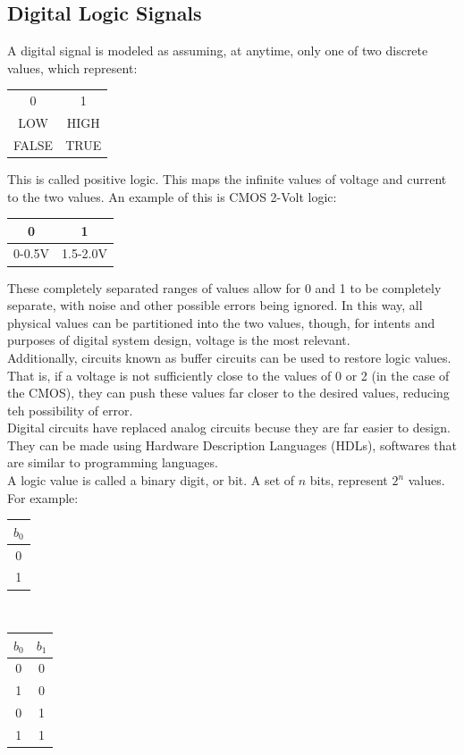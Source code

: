\documentclass[nobib]{tufte-handout}
\begin{document}
\subsection{Digital Logic Signals}
A digital signal is modeled as assuming, at anytime, only one of two discrete values, which represent:\\
\begin{table}
 \centering
    \begin{tabular}{c|c}
    0 & 1 \\
    LOW & HIGH \\
    FALSE & TRUE\\
    \end{tabular}
\end{table}
This is called positive logic.
This maps the infinite values of voltage and current to the two values.
An example of this is CMOS 2-Volt logic:\\
\begin{table}
 \centering
    \begin{tabular}{c|c}
    0 & 1 \\
    \hline
    0-0.5V & 1.5-2.0V \\
    \end{tabular}
\end{table}
These completely separated ranges of values allow for 0 and 1 to be completely separate, with noise and other possible errors being ignored. In this way, all physical values can be partitioned into the two values, though, for intents and purposes of digital system design, voltage is the most relevant.\\
Additionally, circuits known as buffer circuits can be used to restore logic values. That is, if a voltage is not sufficiently close to the values of 0 or 2 (in the case of the CMOS), they can push these values far closer to the desired values, reducing teh possibility of error.\\
Digital circuits have replaced analog circuits becuse they are far easier to design. They can be made using Hardware Description Languages (HDLs), softwares that are similar to programming languages.\\
A logic value is called a binary digit, or bit. A set of $n$ bits, represent $2^n$ values. For example:
\begin{table}
    \centering
       \begin{tabular}{c}
        $b_0$\\
        \hline
       0\\
       1 \\
       \end{tabular}
       \\
       \begin{tabular}{c c}
        $b_0$ & $b_1$\\
        \hline
       0 & 0\\
       1 & 0\\
       0 & 1\\
       1&1
       \end{tabular}
   \end{table}
\end{document}

